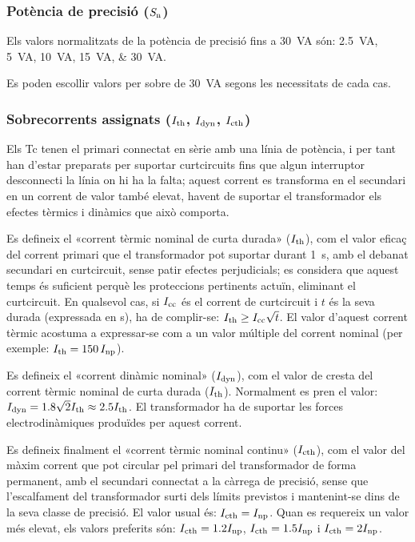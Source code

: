 \subsubsection{Potència de precisió ($S_\mathrm{n}$)}

 Els valors normalitzats de la potència de precisió fins a \SI{30}{VA}
són: \SIlist{2,5; 5;10; 15; 30}{VA}.

Es poden escollir valors per sobre de \SI{30}{VA} segons les necessitats de cada cas.

\subsubsection{Sobrecorrents  assignats ($I_\mathrm{th}$, $I_\mathrm{dyn}$, $I_\mathrm{cth}$)}

 Els Tc
tenen el primari connectat en sèrie amb una línia de potència, i per tant han
d'estar preparats per suportar curtcircuits fins que algun
interruptor desconnecti la línia on hi ha la falta; aquest
corrent es transforma en el secundari en un corrent de valor
també elevat, havent de suportar el transformador els efectes tèrmics
i dinàmics que això comporta.

Es defineix el «corrent tèrmic nominal de curta durada»
($I_\mathrm{th}$), com el valor eficaç del  corrent primari que el
transformador pot suportar durant \SI{1}{s}, amb el debanat
secundari en curtcircuit, sense patir efectes perjudicials; es
considera que aquest temps és suficient perquè les proteccions
pertinents actuïn, eliminant el curtcircuit. En qualsevol cas, si
$I_\mathrm{cc}$ és el corrent de curtcircuit i $t$ és la seva durada
(expressada en s), ha de complir-se: $I_\mathrm{th}\geq
I_\mathrm{cc}\sqrt{t}$. El valor d'aquest corrent tèrmic
acostuma a expressar-se com a un valor múltiple del corrent
nominal (per exemple: $I_\mathrm{th}=150\,I_\mathrm{np}$).

Es defineix el «corrent dinàmic nominal» ($I_\mathrm{dyn}$), com el
valor de cresta del corrent tèrmic nominal de curta durada ($I_\mathrm{th}$).
Normalment es pren el valor: $I_\mathrm{dyn} =
\num{1,8}\sqrt{2}I_\mathrm{th}\approx \num{2,5}I_\mathrm{th}$. El transformador ha de
suportar les forces electrodinàmiques produïdes per aquest corrent.

Es defineix finalment el «corrent tèrmic nominal continu» ($I_\mathrm{cth}$), com
el valor del màxim corrent que pot circular pel primari del
transformador  de forma permanent, amb el secundari connectat a la
càrrega de precisió, sense que l'escalfament del transformador surti
dels límits previstos i mantenint-se dins de la
seva classe de precisió. El valor usual és: $I_\mathrm{cth} = I_\mathrm{np}$. Quan es requereix un valor més elevat, els valors preferits són:
$I_\mathrm{cth} = \num{1,2}I_\mathrm{np}$, $I_\mathrm{cth} = \num{1,5}I_\mathrm{np}$ i $I_\mathrm{cth} = 2 I_\mathrm{np}$.

